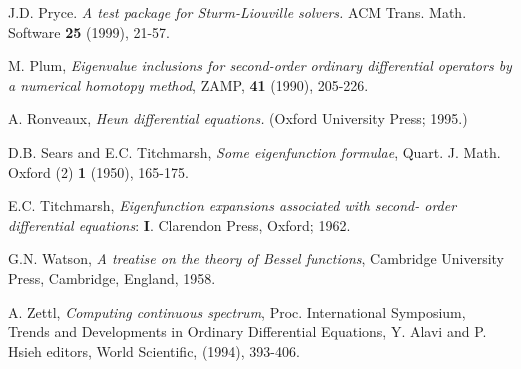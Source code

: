 \documentclass[12pt]{amsart}%
\theoremstyle{plain}
\numberwithin{equation}{section}
\begin{document}
\begin{thebibliography}{9}
J.D. Pryce. \emph{A test package for Sturm-Liouville solvers.}
ACM Trans. Math. Software \textbf{25} (1999), 21-57.

M. Plum, \emph{Eigenvalue inclusions for second-order ordinary
differential operators by a numerical homotopy method}, ZAMP, \textbf{41
}(1990), 205-226.

A. Ronveaux, \emph{Heun differential equations.} (Oxford
University Press; 1995.)

D.B. Sears and E.C. Titchmarsh, \emph{Some eigenfunction
formulae}, Quart. J. Math. Oxford (2) \textbf{1} (1950), 165-175.

E.C. Titchmarsh, \emph{Eigenfunction expansions associated with
second- order differential equations}: \textbf{I}. Clarendon Press, Oxford; 1962.

G.N. Watson, \emph{A treatise on the theory of Bessel functions},
Cambridge University Press, Cambridge, England, 1958.

A. Zettl, \emph{Computing continuous spectrum}, Proc.
International Symposium, Trends and Developments in Ordinary Differential
Equations, Y. Alavi and P. Hsieh editors, World Scientific, (1994), 393-406.
\end{thebibliography}
\end{document}
